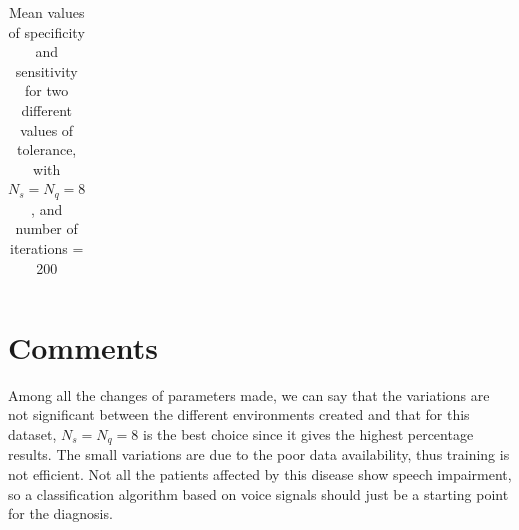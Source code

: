 \documentclass[12pt]{article}
\begin{document}
\begin{table}[H]
\begin{subtable}[h]{0.45\textwidth}
\begin{tabular}{lcccc}
\end{tabular}      \caption{\tiny$tolerance=10^{-2}$}
       \label{tab:3a}
    \end{subtable}
\hspace{0.7cm}
     \caption{Mean values of specificity and sensitivity for two different values of tolerance, with $N_{s} = N_{q} = 8$, and number of iterations = 200}
     \label{table3}
\end{table} 


\section{Comments}
Among all the changes of parameters made, we can say that the variations are not significant between the different environments created and that for this dataset, $N_{s} = N_{q} = 8$ is the best choice since it gives the highest percentage results. The small variations are due to the poor data availability, thus training is not efficient. Not all the patients affected by this disease show speech impairment, so a classification algorithm based on voice signals should just be a starting point for the diagnosis.  
\end{document}
